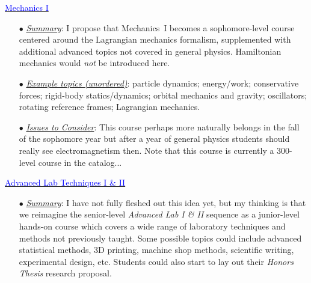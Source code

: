 \documentclass[12pt,preprint]{aastex}
\newcommand{\red}[1]{\textcolor{red}{#1}}
\newcommand{\blue}[1]{\textcolor{blue}{#1}}
\begin{document}
\begin{itemize*}
\item{\underline{\blue{Mechanics I}}
  \begin{itemize}
    \item[$\bullet$]{\underline{\em Summary}: I propose that Mechanics~I becomes
      a sophomore-level course centered around the Lagrangian mechanics
      formalism, supplemented with additional advanced topics not covered in
      general physics.  Hamiltonian mechanics would \emph{not} be introduced
      here.}
    \item[$\bullet$]{\underline{\em Example topics (unordered)}: particle
      dynamics; energy/work; conservative forces; rigid-body statics/dynamics;
      orbital mechanics and gravity; oscillators; rotating reference frames;
      Lagrangian mechanics.}
    \item[$\bullet$]{\underline{\em Issues to Consider}: This course perhaps
      more naturally belongs in the fall of the sophomore year but after a year
      of general physics students should really see electromagnetism then.  Note
      that this course is currently a 300-level course in the catalog...}
  \end{itemize}
}


\item{\underline{\blue{Advanced Lab Techniques I \& II}}
  \begin{itemize}
    \item[$\bullet$]{\underline{\em Summary}: I have not fully fleshed out this
      idea yet, but my thinking is that we reimagine the senior-level {\em
        Advanced Lab I \& II} sequence as a junior-level hands-on course which
      covers a wide range of laboratory techniques and methods not previously
      taught.  Some possible topics could include advanced statistical methods, 
      3D printing, machine shop methods, scientific writing, experimental
      design, etc.  Students could also start to lay out their {\em Honors
        Thesis} research proposal.}
  \end{itemize}
}


\end{itemize*}
\end{document}
